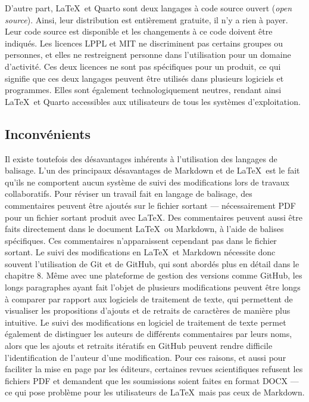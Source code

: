 \documentclass[
  letterpaper,
]{scrbook}
\begin{document}
D'autre part, \LaTeX~et Quarto sont deux langages à code source ouvert
(\emph{open source}). Ainsi, leur distribution est entièrement gratuite,
il n'y a rien à payer. Leur code source est disponible et les
changements à ce code doivent être indiqués. Les licences LPPL et MIT ne
discriminent pas certains groupes ou personnes, et elles ne restreignent
personne dans l'utilisation pour un domaine d'activité. Ces deux
licences ne sont pas spécifiques pour un produit, ce qui signifie que
ces deux langages peuvent être utilisés dans plusieurs logiciels et
programmes. Elles sont également technologiquement neutres, rendant
ainsi \LaTeX~et Quarto accessibles aux utilisateurs de tous les systèmes
d'exploitation.

\hypertarget{inconvuxe9nients-1}{%
\subsection{Inconvénients}\label{inconvuxe9nients-1}}

Il existe toutefois des désavantages inhérents à l'utilisation des
langages de balisage. L'un des principaux désavantages de Markdown et de
\LaTeX~est le fait qu'ils ne comportent aucun système de suivi des
modifications lors de travaux collaboratifs. Pour réviser un travail
fait en langage de balisage, des commentaires peuvent être ajoutés sur
le fichier sortant --- nécessairement PDF pour un fichier sortant
produit avec \LaTeX. Des commentaires peuvent aussi être faits
directement dans le document \LaTeX~ou Markdown, à l'aide de balises
spécifiques. Ces commentaires n'apparaissent cependant pas dans le
fichier sortant. Le suivi des modifications en \LaTeX~et Markdown
nécessite donc souvent l'utilisation de Git et de GitHub, qui sont
abordés plus en détail dans le chapitre 8. Même avec une plateforme de
gestion des versions comme GitHub, les longs paragraphes ayant fait
l'objet de plusieurs modifications peuvent être longs à comparer par
rapport aux logiciels de traitement de texte, qui permettent de
visualiser les propositions d'ajouts et de retraits de caractères de
manière plus intuitive. Le suivi des modifications en logiciel de
traitement de texte permet également de distinguer les auteurs de
différents commentaires par leurs noms, alors que les ajouts et retraits
itératifs en GitHub peuvent rendre difficile l'identification de
l'auteur d'une modification. Pour ces raisons, et aussi pour faciliter
la mise en page par les éditeurs, certaines revues scientifiques
refusent les fichiers PDF et demandent que les soumissions soient faites
en format DOCX --- ce qui pose problème pour les utilisateurs de
\LaTeX~mais pas ceux de Markdown.
\end{document}
